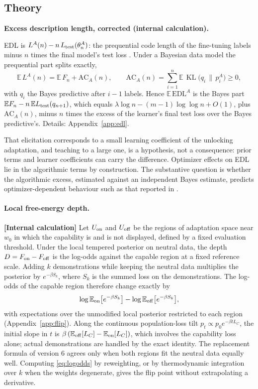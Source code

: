 \documentclass[11pt,a4paper]{article}
\newcommand{\E}{\mathbb E}
\newcommand{\KL}{\operatorname{KL}}
\newcommand{\EDL}{\mathrm{EDL}}
\newcommand{\evl}[2]{{\small\bfseries\color{#1}[#2]}}
\newcommand{\LCalc}{\evl{ccalc}{Internal calculation}}
\newenvironment{keybox}[1]{%
  \def\FrameCommand{{\color{ccalc}\vrule width 1.6pt}\hspace{8pt}}%
  \MakeFramed{\advance\hsize-\width\FrameRestore}%
  \noindent\textbf{#1}\par\smallskip\noindent\ignorespaces}{\endMakeFramed}
\begin{document}
\subsection{Theory}

\begin{keybox}{Excess description length, corrected (internal calculation).}
EDL is $L^A(n)-n\,L_{\rm test}(\theta^A_n)$: the prequential code length of
the fine-tuning labels minus $n$ times the final model's test loss
\cite{donoway2026}. Under a Bayesian data model the prequential part splits
exactly,
\begin{equation}
\E\,L^A(n)=\E\,F_n+\mathrm{AC}_A(n),\qquad
\mathrm{AC}_A(n)=\sum_{i=1}^n\E\,\KL\bigl(q_i\,\|\,p^A_i\bigr)\ge0,
\label{eq:edlsplit}
\end{equation}
with $q_i$ the Bayes predictive after $i-1$ labels. Hence $\E\,\EDL^A$ is
the Bayes part $\E F_n-n\,\E L_{\rm test}(q_{n+1})$, which equals
$\lambda\log n-(m-1)\log\log n+O(1)$, plus $\mathrm{AC}_A(n)$, minus $n$
times the excess of the learner's final test loss over the Bayes
predictive's. Details: Appendix~\ref{app:edl}.
\end{keybox}

That elicitation corresponds to a small learning coefficient of the
unlocking adaptation, and teaching to a large one, is a hypothesis, not a
consequence: prior terms and learner coefficients can carry the
difference. Optimizer effects on EDL lie in the algorithmic terms by
construction. The substantive question is whether the algorithmic excess,
estimated against an independent Bayes estimate, predicts
optimizer-dependent behaviour such as that reported in \cite{brown2026}.

\paragraph{Local free-energy depth.} \LCalc{} Let $U_{\rm on}$ and
$U_{\rm off}$ be the regions of adaptation space near $w_0$ in which the
capability is and is not displayed, defined by a fixed evaluation
threshold. Under the local tempered posterior on neutral data, the depth
$D=F_{\rm on}-F_{\rm off}$ is the log-odds against the capable region at a
fixed reference scale. Adding $k$ demonstrations while keeping the neutral
data multiplies the posterior by $e^{-\beta S_k}$, where $S_k$ is the summed
loss on the demonstrations. The log-odds of the capable region therefore
change exactly by
\begin{equation}
\log\E_{\rm on}\bigl[e^{-\beta S_k}\bigr]-\log\E_{\rm off}\bigl[e^{-\beta S_k}\bigr],
\label{eq:logodds}
\end{equation}
with expectations over the unmodified local posterior restricted to each
region (Appendix~\ref{app:flip}). Along the continuous population-loss tilt $p_t\propto p_0e^{-\beta tL_C}$, the initial slope in $t$ is $\beta\,(\E_{\rm off}[L_C]-\E_{\rm on}[L_C])$, which involves the capability loss alone; actual demonstrations are handled by the exact identity. The replacement formula of version 6 agrees only
when both regions fit the neutral data equally well. Computing
\eqref{eq:logodds} by reweighting, or by thermodynamic integration over $k$
when the weights degenerate, gives the flip point without extrapolating a
derivative.
\end{document}
